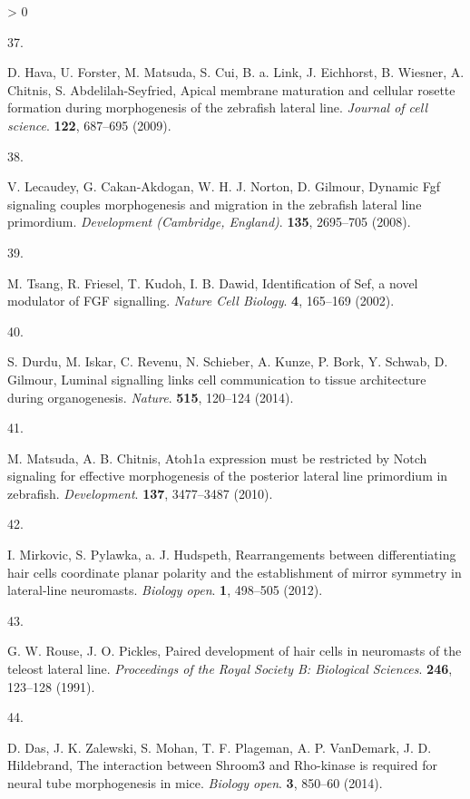 \documentclass[10pt, b5paper, singlespacinge, twoside]{reedthesis} %
\newlength{\cslhangindent}
\newlength{\csllabelwidth}
\newenvironment{CSLReferences}[3] %
  {%
    \setlength{\parindent}{0pt}
    \ifodd #1 \everypar{\setlength{\hangindent}{\cslhangindent}}\ignorespaces\fi
    \ifnum #2 > 0
    \setlength{\parskip}{#2\baselineskip}
    \fi
  }%
  {}
\newcommand{\CSLLeftMargin}[1]{\parbox[t]{\maxof{\widthof{#1}}{\csllabelwidth}}{#1}}
\newcommand{\CSLRightInline}[1]{\parbox[t]{\linewidth}{#1}}
\theoremstyle{definition}
\theoremstyle{definition}
\theoremstyle{definition}
\theoremstyle{remark}
\begin{document}
\begin{CSLReferences}{0}{0}
\leavevmode\hypertarget{ref-Hava2009}{}%
\CSLLeftMargin{37. }
\CSLRightInline{D. Hava, U. Forster, M. Matsuda, S. Cui, B. a. Link, J. Eichhorst, B. Wiesner, A. Chitnis, S. Abdelilah-Seyfried, {Apical membrane maturation and cellular rosette formation during morphogenesis of the zebrafish lateral line.} \emph{Journal of cell science}. \textbf{122}, 687--695 (2009).}

\leavevmode\hypertarget{ref-Lecaudey2008a}{}%
\CSLLeftMargin{38. }
\CSLRightInline{V. Lecaudey, G. Cakan-Akdogan, W. H. J. Norton, D. Gilmour, {Dynamic Fgf signaling couples morphogenesis and migration in the zebrafish lateral line primordium.} \emph{Development (Cambridge, England)}. \textbf{135}, 2695--705 (2008).}

\leavevmode\hypertarget{ref-Tsang}{}%
\CSLLeftMargin{39. }
\CSLRightInline{M. Tsang, R. Friesel, T. Kudoh, I. B. Dawid, {Identification of Sef, a novel modulator of FGF signalling}. \emph{Nature Cell Biology}. \textbf{4}, 165--169 (2002).}

\leavevmode\hypertarget{ref-Durdu2014a}{}%
\CSLLeftMargin{40. }
\CSLRightInline{S. Durdu, M. Iskar, C. Revenu, N. Schieber, A. Kunze, P. Bork, Y. Schwab, D. Gilmour, {Luminal signalling links cell communication to tissue architecture during organogenesis}. \emph{Nature}. \textbf{515}, 120--124 (2014).}

\leavevmode\hypertarget{ref-Matsuda2010b}{}%
\CSLLeftMargin{41. }
\CSLRightInline{M. Matsuda, A. B. Chitnis, {Atoh1a expression must be restricted by Notch signaling for effective morphogenesis of the posterior lateral line primordium in zebrafish}. \emph{Development}. \textbf{137}, 3477--3487 (2010).}

\leavevmode\hypertarget{ref-Mirkovic2012}{}%
\CSLLeftMargin{42. }
\CSLRightInline{I. Mirkovic, S. Pylawka, a. J. Hudspeth, {Rearrangements between differentiating hair cells coordinate planar polarity and the establishment of mirror symmetry in lateral-line neuromasts.} \emph{Biology open}. \textbf{1}, 498--505 (2012).}

\leavevmode\hypertarget{ref-Rouse1991}{}%
\CSLLeftMargin{43. }
\CSLRightInline{G. W. Rouse, J. O. Pickles, {Paired development of hair cells in neuromasts of the teleost lateral line}. \emph{Proceedings of the Royal Society B: Biological Sciences}. \textbf{246}, 123--128 (1991).}

\leavevmode\hypertarget{ref-Das2014a}{}%
\CSLLeftMargin{44. }
\CSLRightInline{D. Das, J. K. Zalewski, S. Mohan, T. F. Plageman, A. P. VanDemark, J. D. Hildebrand, {The interaction between Shroom3 and Rho-kinase is required for neural tube morphogenesis in mice.} \emph{Biology open}. \textbf{3}, 850--60 (2014).}


\end{CSLReferences}
\end{document}
